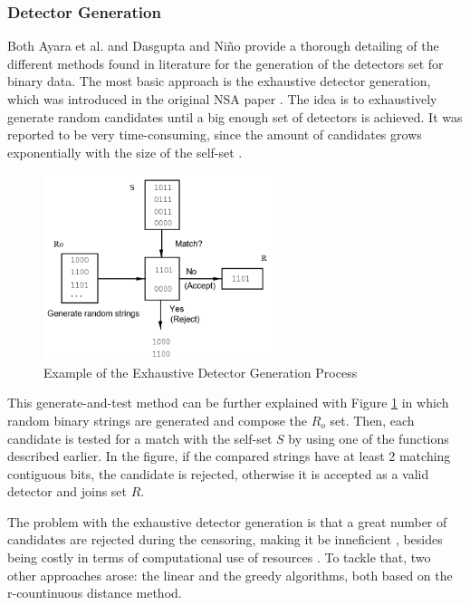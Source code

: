 \subsubsection{Detector Generation} \label{sec:bgNSADetectors}


Both Ayara et al. \cite{NSADetectorGen2002} and Dasgupta and Niño \cite{ICBook2009} provide a thorough detailing of the different methods found in literature for the generation of the detectors set for binary data. The most basic approach is the exhaustive detector generation, which was introduced in the original NSA paper \cite{Forrest1994}. The idea is to exhaustively generate random candidates until a big enough set of detectors is achieved. It was reported to be very time-consuming, since the amount of candidates grows exponentially with the size of the self-set \cite{LinearNSA1996}.

\begin{figure}[!h]
	\centering
	\includegraphics[width=0.6\textwidth, keepaspectratio]{img/exhaustiveNSA.png}
	\caption{Example of the Exhaustive Detector Generation Process~ \cite{LinearNSA1996} }
	\label{fig:ExhDet}
\end{figure}

This generate-and-test method can be further explained with Figure \ref{fig:ExhDet} in which random binary strings are generated and compose the \(R_o\) set. Then, each candidate is tested for a match with the self-set \(S\) by using one of the functions described earlier. In the figure, if the compared strings have at least 2 matching contiguous bits, the candidate is rejected, otherwise it is accepted as a valid detector and joins set \(R\).

The problem with the exhaustive detector generation is that a great number of candidates are rejected during the censoring, making it be inneficient \cite{NSADetGen1996}, besides being costly in terms of computational use of resources \cite{NSADetectorGen2002}. To tackle that, two other approaches arose: the linear and the greedy algorithms, both based on the r-countinuous distance method. 

